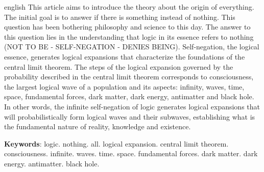 \vspace{1mm}
\renewcommand{\resumoname}{Abstract}
\begin{resumoumacoluna}
 \begin{otherlanguage*}{english}
\vspace{-2mm}
	This article aims to introduce the theory about the origin of everything. The initial goal is to answer if there is something instead of nothing. This question has been bothering philosophy and science to this day. The answer to this question lies in the understanding that logic in its essence refers to nothing (NOT TO BE - SELF-NEGATION - DENIES BEING). Self-negation, the logical essence, generates logical expansions that characterize the foundations of the central limit theorem. The steps of the logical expansion governed by the probability described in the central limit theorem corresponds to consciousness, the largest logical wave of a population and its aspects: infinity, waves, time, space, fundamental forces, dark matter, dark energy, antimatter and black hole. In other words, the infinite self-negation of logic generates logical expansions that will probabilistically form logical waves and their subwaves, establishing what is the fundamental nature of reality, knowledge and existence.
\noindent
	
	\textbf{Keywords}: logic. nothing. all. logical expansion. central limit theorem. consciousness. infinite. waves. time. space. fundamental forces. dark matter. dark energy. antimatter. black hole.
 \end{otherlanguage*}  
\end{resumoumacoluna}

